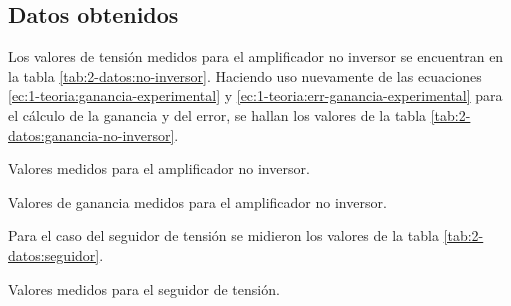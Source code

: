 \subsection{Datos obtenidos}

Los valores de tensión medidos para el amplificador no inversor se encuentran
en la tabla \ref{tab:2-datos:no-inversor}. Haciendo uso nuevamente de las 
ecuaciones \ref{ec:1-teoria:ganancia-experimental} y 
\ref{ec:1-teoria:err-ganancia-experimental} para el cálculo de la ganancia y 
del error, se hallan los valores de la tabla \ref{tab:2-datos:ganancia-no-inversor}.

\begin{table}[H]
    \centering
    \caption{Valores medidos para el amplificador no inversor.}
    \label{tab:2-datos:no-inversor}
\end{table}

\begin{table}[H]
    \centering
    \caption{Valores de ganancia medidos para el amplificador no inversor.}
    \label{tab:2-datos:ganancia-no-inversor}
\end{table}

Para el caso del seguidor de tensión se midieron los valores de la tabla 
\ref{tab:2-datos:seguidor}.

\begin{table}[H]
    \centering
    \caption{Valores medidos para el seguidor de tensión.}
    \label{tab:2-datos:seguidor}
\end{table}

